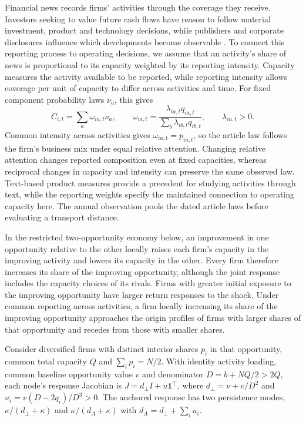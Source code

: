 Financial news records firms' activities through the coverage they receive.
Investors seeking to value future cash flows have reason to follow material
investment, product and technology decisions, while publishers and corporate
disclosures influence which developments become observable
\citep{gentzkow_media_bias_2006}.
To connect this reporting process to operating decisions, we assume that an
activity's share of news is proportional to its capacity weighted by its
reporting intensity.
Capacity measures the activity available to be reported, while reporting intensity
allows coverage per unit of capacity to differ across activities and time.
For fixed component probability laws $\nu_a$, this gives
\begin{equation}\label{eq:reporting-law}
  C_{i,t}=\sum_a\omega_{ia,t}\nu_a,\qquad
  \omega_{ia,t}=\frac{\lambda_{ia,t}q_{ia,t}}
  {\sum_b\lambda_{ib,t}q_{ib,t}},\qquad\lambda_{ia,t}>0.
\end{equation}
Common intensity across activities gives $\omega_{ia,t}=p_{ia,t}$, so the
article law follows the firm's business mix under equal relative attention.
Changing relative attention changes reported composition even at fixed
capacities, whereas reciprocal changes in capacity and intensity can
preserve the same observed law.
Text-based product measures \citep{hoberg_phillips_2016} provide a precedent
for studying activities through text, while the reporting weights specify
the maintained connection to operating capacity here.
The annual observation pools the dated article laws before evaluating a
transport distance.

In the restricted two-opportunity economy below, an improvement in one
opportunity relative to the other locally raises each firm's capacity in the
improving activity and lowers its capacity in the other.
Every firm therefore increases its share of the improving opportunity,
although the joint response includes the capacity choices of its rivals.
Firms with greater initial exposure to the improving opportunity have larger
return responses to the shock.
Under common reporting across activities, a firm locally increasing its share
of the improving opportunity approaches the origin profiles of firms with
larger shares of that opportunity and recedes from those with smaller shares.

Consider diversified firms with distinct interior shares $p_i$ in that
opportunity, common total capacity $Q$ and $\sum_i p_i=N/2$.
With identity activity loading, common baseline opportunity value $v$ and
denominator $D=b+NQ/2>2Q$, each node's response Jacobian is
$J=d_\perp I+u\mathbf1^\top$, where
$d_\perp=\nu+v/D^2$ and $u_i=v(D-2q_i)/D^3>0$.
The anchored response has two persistence modes, $\kappa/(d_\perp+\kappa)$
and $\kappa/(d_A+\kappa)$ with $d_A=d_\perp+\sum_i u_i$.


